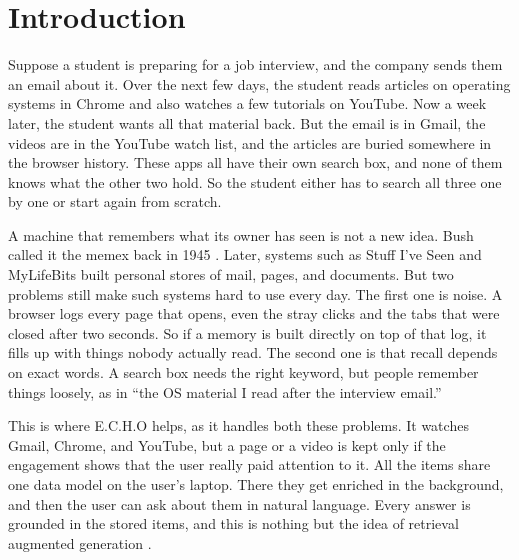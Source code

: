 \documentclass[conference]{IEEEtran}
\begin{document}
\section{Introduction}
Suppose a student is preparing for a job interview, and the company sends them an email about it. Over the next few days, the student reads articles on operating systems in Chrome and also watches a few tutorials on YouTube. Now a week later, the student wants all that material back. But the email is in Gmail, the videos are in the YouTube watch list, and the articles are buried somewhere in the browser history. These apps all have their own search box, and none of them knows what the other two hold. So the student either has to search all three one by one or start again from scratch.

A machine that remembers what its owner has seen is not a new idea. Bush called it the memex back in 1945 \cite{b1}. Later, systems such as Stuff I've Seen \cite{b2} and MyLifeBits \cite{b3} built personal stores of mail, pages, and documents. But two problems still make such systems hard to use every day. The first one is noise. A browser logs every page that opens, even the stray clicks and the tabs that were closed after two seconds. So if a memory is built directly on top of that log, it fills up with things nobody actually read. The second one is that recall depends on exact words. A search box needs the right keyword, but people remember things loosely, as in ``the OS material I read after the interview email.''

This is where E.C.H.O helps, as it handles both these problems. It watches Gmail, Chrome, and YouTube, but a page or a video is kept only if the engagement shows that the user really paid attention to it. All the items share one data model on the user's laptop. There they get enriched in the background, and then the user can ask about them in natural language. Every answer is grounded in the stored items, and this is nothing but the idea of retrieval augmented generation \cite{b4}.
\end{document}
